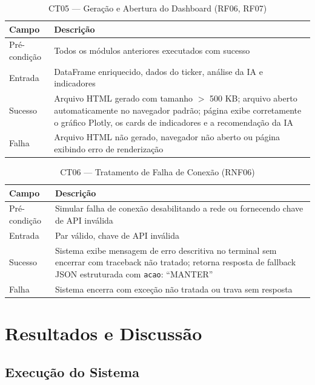 \documentclass[conference]{IEEEtran}
\begin{document}
\begin{table}[H]
  \centering
  \caption{CT05 — Geração e Abertura do Dashboard (RF06, RF07)}
  \label{tab:ct05}
  \begin{tabular}{p{2.5cm}p{5cm}}
    \toprule
    \textbf{Campo} & \textbf{Descrição} \\
    \midrule
    Pré-condição  & Todos os módulos anteriores executados com sucesso \\
    Entrada       & DataFrame enriquecido, dados do ticker, análise da IA e indicadores \\
    Sucesso       & Arquivo HTML gerado com tamanho $>$ 500 KB; arquivo aberto automaticamente no navegador padrão; página exibe corretamente o gráfico Plotly, os cards de indicadores e a recomendação da IA \\
    Falha         & Arquivo HTML não gerado, navegador não aberto ou página exibindo erro de renderização \\
    \bottomrule
  \end{tabular}
\end{table}

\begin{table}[H]
  \centering
  \caption{CT06 — Tratamento de Falha de Conexão (RNF06)}
  \label{tab:ct06}
  \begin{tabular}{p{2.5cm}p{5cm}}
    \toprule
    \textbf{Campo} & \textbf{Descrição} \\
    \midrule
    Pré-condição  & Simular falha de conexão desabilitando a rede ou fornecendo chave de API inválida \\
    Entrada       & Par válido, chave de API inválida \\
    Sucesso       & Sistema exibe mensagem de erro descritiva no terminal sem encerrar com traceback não tratado; retorna resposta de fallback JSON estruturada com \texttt{acao}: ``MANTER'' \\
    Falha         & Sistema encerra com exceção não tratada ou trava sem resposta \\
    \bottomrule
  \end{tabular}
\end{table}

\section{Resultados e Discussão}
\label{sec:resultados}

\subsection{Execução do Sistema}
\end{document}

